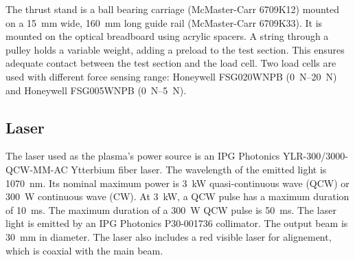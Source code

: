             The thrust stand is a ball bearing carriage (McMaster-Carr 6709K12) mounted on a \qty{15}{mm} wide, \qty{160}{mm} long guide rail (McMaster-Carr 6709K33). It is mounted on the optical breadboard using acrylic spacers. A string through a pulley holds a variable weight, adding a preload to the test section. This ensures adequate contact between the test section and the load cell. Two load cells are used with different force sensing range: Honeywell FSG020WNPB (\qtyrange{0}{20}{N}) and Honeywell FSG005WNPB (\qtyrange{0}{5}{N}).

        \subsection{Laser}

            The laser used as the plasma's power source is an IPG Photonics YLR-300/3000-QCW-MM-AC Ytterbium fiber laser. The wavelength of the emitted light is \qty{1070}{nm}. Its nominal maximum power is \qty{3}{kW} quasi-continuous wave (QCW) or \qty{300}{W} continuous wave (CW). At \qty{3}{kW}, a QCW pulse has a maximum duration of \qty{10}{ms}. The maximum duration of a \qty{300}{W} QCW pulse is \qty{50}{ms}. The laser light is emitted by an IPG Photonics P30-001736 collimator. The output beam is \qty{30}{mm} in diameter. The laser also includes a red visible laser for alignement, which is coaxial with the main beam.

